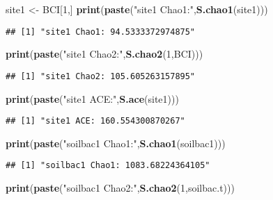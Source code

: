 \documentclass[
]{article}
\newenvironment{Shaded}{\begin{snugshade}}{\end{snugshade}}
\newcommand{\DecValTok}[1]{\textcolor[rgb]{0.00,0.00,0.81}{#1}}
\newcommand{\KeywordTok}[1]{\textcolor[rgb]{0.13,0.29,0.53}{\textbf{#1}}}
\newcommand{\NormalTok}[1]{#1}
\newcommand{\StringTok}[1]{\textcolor[rgb]{0.31,0.60,0.02}{#1}}
\begin{document}
\begin{Shaded}
\begin{Highlighting}[]
\NormalTok{site1 <-}\StringTok{ }\NormalTok{BCI[}\DecValTok{1}\NormalTok{,]}
\KeywordTok{print}\NormalTok{(}\KeywordTok{paste}\NormalTok{(}\StringTok{"site1 Chao1:"}\NormalTok{,}\KeywordTok{S.chao1}\NormalTok{(site1)))}
\end{Highlighting}
\end{Shaded}

\begin{verbatim}
## [1] "site1 Chao1: 94.5333372974875"
\end{verbatim}

\begin{Shaded}
\begin{Highlighting}[]
\KeywordTok{print}\NormalTok{(}\KeywordTok{paste}\NormalTok{(}\StringTok{"site1 Chao2:"}\NormalTok{,}\KeywordTok{S.chao2}\NormalTok{(}\DecValTok{1}\NormalTok{,BCI)))}
\end{Highlighting}
\end{Shaded}

\begin{verbatim}
## [1] "site1 Chao2: 105.605263157895"
\end{verbatim}

\begin{Shaded}
\begin{Highlighting}[]
\KeywordTok{print}\NormalTok{(}\KeywordTok{paste}\NormalTok{(}\StringTok{"site1 ACE:"}\NormalTok{,}\KeywordTok{S.ace}\NormalTok{(site1)))}
\end{Highlighting}
\end{Shaded}

\begin{verbatim}
## [1] "site1 ACE: 160.554300870267"
\end{verbatim}

\begin{Shaded}
\begin{Highlighting}[]
\KeywordTok{print}\NormalTok{(}\KeywordTok{paste}\NormalTok{(}\StringTok{"soilbac1 Chao1:"}\NormalTok{,}\KeywordTok{S.chao1}\NormalTok{(soilbac1)))}
\end{Highlighting}
\end{Shaded}

\begin{verbatim}
## [1] "soilbac1 Chao1: 1083.68224364105"
\end{verbatim}

\begin{Shaded}
\begin{Highlighting}[]
\KeywordTok{print}\NormalTok{(}\KeywordTok{paste}\NormalTok{(}\StringTok{"soilbac1 Chao2:"}\NormalTok{,}\KeywordTok{S.chao2}\NormalTok{(}\DecValTok{1}\NormalTok{,soilbac.t)))}
\end{Highlighting}
\end{Shaded}
\end{document}
